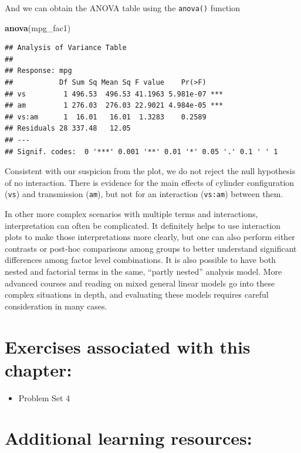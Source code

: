 \documentclass[]{book}
\newenvironment{Shaded}{\begin{snugshade}}{\end{snugshade}}
\newcommand{\KeywordTok}[1]{\textcolor[rgb]{0.13,0.29,0.53}{\textbf{#1}}}
\newcommand{\NormalTok}[1]{#1}
\providecommand{\tightlist}{%
  \setlength{\itemsep}{0pt}\setlength{\parskip}{0pt}}
\begin{document}
And we can obtain the ANOVA table using the \texttt{anova()} function

\begin{Shaded}
\begin{Highlighting}[]
\KeywordTok{anova}\NormalTok{(mpg_fac1)}
\end{Highlighting}
\end{Shaded}

\begin{verbatim}
## Analysis of Variance Table
## 
## Response: mpg
##           Df Sum Sq Mean Sq F value    Pr(>F)    
## vs         1 496.53  496.53 41.1963 5.981e-07 ***
## am         1 276.03  276.03 22.9021 4.984e-05 ***
## vs:am      1  16.01   16.01  1.3283    0.2589    
## Residuals 28 337.48   12.05                      
## ---
## Signif. codes:  0 '***' 0.001 '**' 0.01 '*' 0.05 '.' 0.1 ' ' 1
\end{verbatim}

Consistent with our suspicion from the plot, we do not reject the null hypothesis of no interaction. There is evidence for the main effects of cylinder configuration (\texttt{vs}) and transmission (\texttt{am}), but not for an interaction (\texttt{vs:am}) between them.

In other more complex scenarios with multiple terms and interactions, interpretation can often be complicated. It definitely helps to use interaction plots to make those interpretations more clearly, but one can also perform either contrasts or post-hoc comparisons among groups to better understand significant differences among factor level combinations. It is also possible to have both nested and factorial terms in the same, ``partly nested'' analysis model. More advanced courses and reading on mixed general linear models go into these complex situations in depth, and evaluating these models requires careful consideration in many cases.

\hypertarget{exercises-associated-with-this-chapter-8}{%
\section{Exercises associated with this chapter:}\label{exercises-associated-with-this-chapter-8}}

\begin{itemize}
\tightlist
\item
  Problem Set 4
\end{itemize}

\hypertarget{additional-learning-resources-8}{%
\section{Additional learning resources:}\label{additional-learning-resources-8}}
\end{document}
